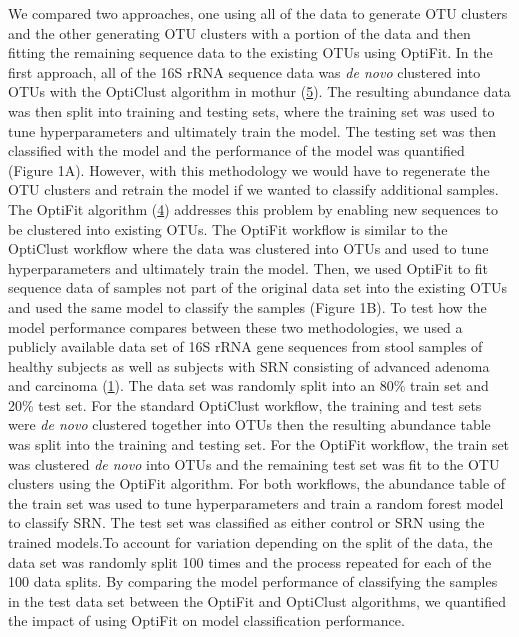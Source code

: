 \documentclass[
]{article}
\begin{document}
We compared two approaches, one using all of the data to generate OTU
clusters and the other generating OTU clusters with a portion of the
data and then fitting the remaining sequence data to the existing OTUs
using OptiFit. In the first approach, all of the 16S rRNA sequence data
was \emph{de novo} clustered into OTUs with the OptiClust algorithm in
mothur (\protect\hyperlink{ref-westcott2017}{5}). The resulting
abundance data was then split into training and testing sets, where the
training set was used to tune hyperparameters and ultimately train the
model. The testing set was then classified with the model and the
performance of the model was quantified (Figure 1A). However, with this
methodology we would have to regenerate the OTU clusters and retrain the
model if we wanted to classify additional samples. The OptiFit algorithm
(\protect\hyperlink{ref-sovacool2022}{4}) addresses this problem by
enabling new sequences to be clustered into existing OTUs. The OptiFit
workflow is similar to the OptiClust workflow where the data was
clustered into OTUs and used to tune hyperparameters and ultimately
train the model. Then, we used OptiFit to fit sequence data of samples
not part of the original data set into the existing OTUs and used the
same model to classify the samples (Figure 1B). To test how the model
performance compares between these two methodologies, we used a publicly
available data set of 16S rRNA gene sequences from stool samples of
healthy subjects as well as subjects with SRN consisting of advanced
adenoma and carcinoma (\protect\hyperlink{ref-baxter2016}{1}). The data
set was randomly split into an 80\% train set and 20\% test set. For the
standard OptiClust workflow, the training and test sets were \emph{de
novo} clustered together into OTUs then the resulting abundance table
was split into the training and testing set. For the OptiFit workflow,
the train set was clustered \emph{de novo} into OTUs and the remaining
test set was fit to the OTU clusters using the OptiFit algorithm. For
both workflows, the abundance table of the train set was used to tune
hyperparameters and train a random forest model to classify SRN. The
test set was classified as either control or SRN using the trained
models.To account for variation depending on the split of the data, the
data set was randomly split 100 times and the process repeated for each
of the 100 data splits. By comparing the model performance of
classifying the samples in the test data set between the OptiFit and
OptiClust algorithms, we quantified the impact of using OptiFit on model
classification performance.
\end{document}
